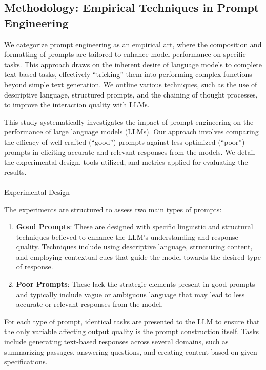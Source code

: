 \documentclass[
]{agujournal2019}
\makeatletter
\let\oldparagraph\paragraph
\renewcommand{\paragraph}{
    \@ifstar
      \xxxParagraphStar
      \xxxParagraphNoStar
  }
\newcommand{\xxxParagraphStar}[1]{\oldparagraph*{#1}\mbox{}}
\newcommand{\xxxParagraphNoStar}[1]{\oldparagraph{#1}\mbox{}}
\makeatother
\begin{document}
\subsection{Methodology: Empirical Techniques in Prompt
Engineering}\label{methodology-empirical-techniques-in-prompt-engineering}

We categorize prompt engineering as an empirical art, where the
composition and formatting of prompts are tailored to enhance model
performance on specific tasks. This approach draws on the inherent
desire of language models to complete text-based tasks, effectively
``tricking'' them into performing complex functions beyond simple text
generation. We outline various techniques, such as the use of
descriptive language, structured prompts, and the chaining of thought
processes, to improve the interaction quality with LLMs.

This study systematically investigates the impact of prompt engineering
on the performance of large language models (LLMs). Our approach
involves comparing the efficacy of well-crafted (``good'') prompts
against less optimized (``poor'') prompts in eliciting accurate and
relevant responses from the models. We detail the experimental design,
tools utilized, and metrics applied for evaluating the results.

\paragraph{Experimental Design}\label{experimental-design}

The experiments are structured to assess two main types of prompts:

\begin{enumerate}
\def\labelenumi{\arabic{enumi}.}
\item
  \textbf{Good Prompts}: These are designed with specific linguistic and
  structural techniques believed to enhance the LLM's understanding and
  response quality. Techniques include using descriptive language,
  structuring content, and employing contextual cues that guide the
  model towards the desired type of response.
\item
  \textbf{Poor Prompts}: These lack the strategic elements present in
  good prompts and typically include vague or ambiguous language that
  may lead to less accurate or relevant responses from the model.
\end{enumerate}

For each type of prompt, identical tasks are presented to the LLM to
ensure that the only variable affecting output quality is the prompt
construction itself. Tasks include generating text-based responses
across several domains, such as summarizing passages, answering
questions, and creating content based on given specifications.
\end{document}
